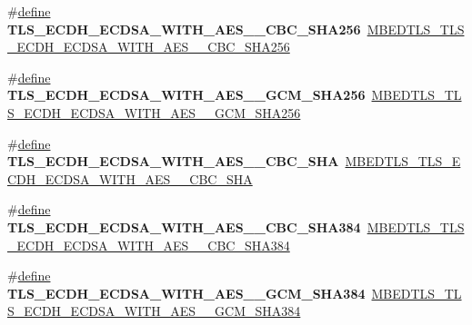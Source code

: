 \begin{DoxyCompactItemize}
\item 
\mbox{\label{compat-1_83_8h_a10f10a84c77909bb5e3d484b3f904a0b}} 
\#\hyperlink{structdefine}{define} {\bfseries T\+L\+S\+\_\+\+E\+C\+D\+H\+\_\+\+E\+C\+D\+S\+A\+\_\+\+W\+I\+T\+H\+\_\+\+A\+E\+S\+\_\+\_\+\+C\+B\+C\+\_\+\+S\+H\+A256}~\hyperlink{ssl__ciphersuites_8h_ac71add892666441d54e693d4e525c73b}{M\+B\+E\+D\+T\+L\+S\+\_\+\+T\+L\+S\+\_\+\+E\+C\+D\+H\+\_\+\+E\+C\+D\+S\+A\+\_\+\+W\+I\+T\+H\+\_\+\+A\+E\+S\+\_\+\_\+\+C\+B\+C\+\_\+\+S\+H\+A256}
\item 
\mbox{\label{compat-1_83_8h_a26d67663de7dae18c51969bcdc3bd70d}} 
\#\hyperlink{structdefine}{define} {\bfseries T\+L\+S\+\_\+\+E\+C\+D\+H\+\_\+\+E\+C\+D\+S\+A\+\_\+\+W\+I\+T\+H\+\_\+\+A\+E\+S\+\_\+\_\+\+G\+C\+M\+\_\+\+S\+H\+A256}~\hyperlink{ssl__ciphersuites_8h_ae4dd0670307b54f0fc5eb1b82066db22}{M\+B\+E\+D\+T\+L\+S\+\_\+\+T\+L\+S\+\_\+\+E\+C\+D\+H\+\_\+\+E\+C\+D\+S\+A\+\_\+\+W\+I\+T\+H\+\_\+\+A\+E\+S\+\_\+\_\+\+G\+C\+M\+\_\+\+S\+H\+A256}
\item 
\mbox{\label{compat-1_83_8h_a97381c3874fcdbebe366ff26c3c023fe}} 
\#\hyperlink{structdefine}{define} {\bfseries T\+L\+S\+\_\+\+E\+C\+D\+H\+\_\+\+E\+C\+D\+S\+A\+\_\+\+W\+I\+T\+H\+\_\+\+A\+E\+S\+\_\+\_\+\+C\+B\+C\+\_\+\+S\+HA}~\hyperlink{ssl__ciphersuites_8h_ab731a48b34955555c166402d6be5f166}{M\+B\+E\+D\+T\+L\+S\+\_\+\+T\+L\+S\+\_\+\+E\+C\+D\+H\+\_\+\+E\+C\+D\+S\+A\+\_\+\+W\+I\+T\+H\+\_\+\+A\+E\+S\+\_\+\_\+\+C\+B\+C\+\_\+\+S\+HA}
\item 
\mbox{\label{compat-1_83_8h_a0f8e1a381e135f77525a9c6393eb924f}} 
\#\hyperlink{structdefine}{define} {\bfseries T\+L\+S\+\_\+\+E\+C\+D\+H\+\_\+\+E\+C\+D\+S\+A\+\_\+\+W\+I\+T\+H\+\_\+\+A\+E\+S\+\_\+\_\+\+C\+B\+C\+\_\+\+S\+H\+A384}~\hyperlink{ssl__ciphersuites_8h_a71a64e94a9d26e95b4a7070a32bc43d4}{M\+B\+E\+D\+T\+L\+S\+\_\+\+T\+L\+S\+\_\+\+E\+C\+D\+H\+\_\+\+E\+C\+D\+S\+A\+\_\+\+W\+I\+T\+H\+\_\+\+A\+E\+S\+\_\+\_\+\+C\+B\+C\+\_\+\+S\+H\+A384}
\item 
\mbox{\label{compat-1_83_8h_aef3dcb9d6fae59e0efb4d5dc4997f5c4}} 
\#\hyperlink{structdefine}{define} {\bfseries T\+L\+S\+\_\+\+E\+C\+D\+H\+\_\+\+E\+C\+D\+S\+A\+\_\+\+W\+I\+T\+H\+\_\+\+A\+E\+S\+\_\+\_\+\+G\+C\+M\+\_\+\+S\+H\+A384}~\hyperlink{ssl__ciphersuites_8h_a6cfb6bc4832006215ea8b467a1dda6fd}{M\+B\+E\+D\+T\+L\+S\+\_\+\+T\+L\+S\+\_\+\+E\+C\+D\+H\+\_\+\+E\+C\+D\+S\+A\+\_\+\+W\+I\+T\+H\+\_\+\+A\+E\+S\+\_\+\_\+\+G\+C\+M\+\_\+\+S\+H\+A384}

\end{DoxyCompactItemize}
